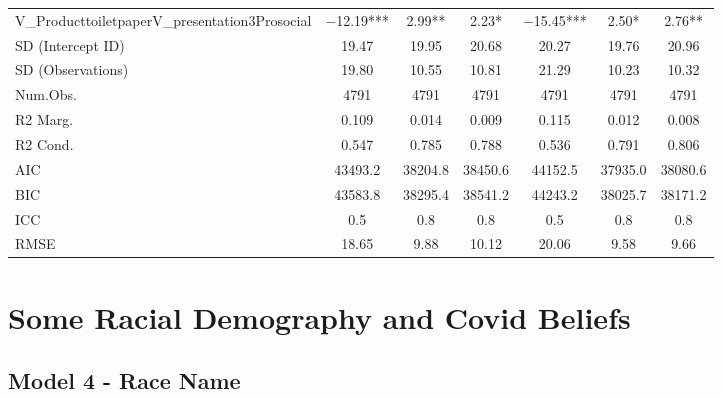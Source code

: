 \documentclass[]{report}
\begin{document}
\begin{table}
{\begin{tabular}[t]{lcccccc}
		V\_ProducttoiletpaperV\_presentation3Prosocial & \num{-12.19}*** & \num{2.99}** & \num{2.23}* & \num{-15.45}*** & \num{2.50}* & \num{2.76}**\\
		SD (Intercept ID) & \num{19.47} & \num{19.95} & \num{20.68} & \num{20.27} & \num{19.76} & \num{20.96}\\
		SD (Observations) & \num{19.80} & \num{10.55} & \num{10.81} & \num{21.29} & \num{10.23} & \num{10.32}\\
		\midrule
		Num.Obs. & \num{4791} & \num{4791} & \num{4791} & \num{4791} & \num{4791} & \num{4791}\\
		R2 Marg. & \num{0.109} & \num{0.014} & \num{0.009} & \num{0.115} & \num{0.012} & \num{0.008}\\
		R2 Cond. & \num{0.547} & \num{0.785} & \num{0.788} & \num{0.536} & \num{0.791} & \num{0.806}\\
		AIC & \num{43493.2} & \num{38204.8} & \num{38450.6} & \num{44152.5} & \num{37935.0} & \num{38080.6}\\
		BIC & \num{43583.8} & \num{38295.4} & \num{38541.2} & \num{44243.2} & \num{38025.7} & \num{38171.2}\\
		ICC & \num{0.5} & \num{0.8} & \num{0.8} & \num{0.5} & \num{0.8} & \num{0.8}\\
		RMSE & \num{18.65} & \num{9.88} & \num{10.12} & \num{20.06} & \num{9.58} & \num{9.66}\\
		\bottomrule
	\end{tabular}}
\end{table}






\part{Some Racial Demography and Covid Beliefs}

\chapter{Model 4 - Race Name}
\end{document}
